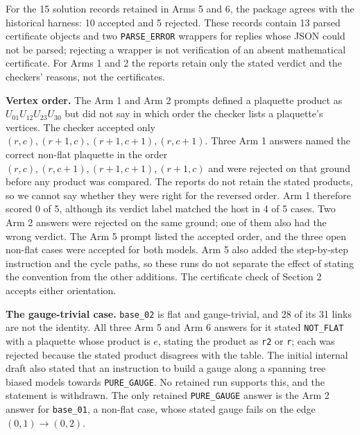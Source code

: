 \documentclass[
  11pt,
]{article}
\begin{document}
For the 15 solution records retained in Arms 5 and 6, the package agrees
with the historical harness: 10 accepted and 5 rejected. These records
contain 13 parsed certificate objects and two
\texttt{PARSE\_\allowbreak{}ERROR} wrappers for replies whose JSON could
not be parsed; rejecting a wrapper is not verification of an absent
mathematical certificate. For Arms 1 and 2 the reports retain only the
stated verdict and the checkers' reasons, not the certificates.

\textbf{Vertex order.} The Arm 1 and Arm 2 prompts defined a plaquette
product as \(U_{01} U_{12} U_{23} U_{30}\) but did not say in which
order the checker lists a plaquette's vertices. The checker accepted
only \((r,c), (r+1,c), (r+1,c+1), (r,c+1)\). Three Arm 1 answers named
the correct non-flat plaquette in the order
\((r,c), (r,c+1), (r+1,c+1), (r+1,c)\) and were rejected on that ground
before any product was compared. The reports do not retain the stated
products, so we cannot say whether they were right for the reversed
order. Arm 1 therefore scored 0 of 5, although its verdict label matched
the host in 4 of 5 cases. Two Arm 2 answers were rejected on the same
ground; one of them also had the wrong verdict. The Arm 5 prompt listed
the accepted order, and the three open non-flat cases were accepted for
both models. Arm 5 also added the step-by-step instruction and the cycle
paths, so these runs do not separate the effect of stating the
convention from the other additions. The certificate check of Section 2
accepts either orientation.

\textbf{The gauge-trivial case.} \texttt{base\_\allowbreak{}02} is flat
and gauge-trivial, and 28 of its 31 links are not the identity. All
three Arm 5 and Arm 6 answers for it stated
\texttt{NOT\_\allowbreak{}FLAT} with a plaquette whose product is \(e\),
stating the product as \texttt{r2} or \texttt{r}; each was rejected
because the stated product disagrees with the table. The initial
internal draft also stated that an instruction to build a gauge along a
spanning tree biased models towards \texttt{PURE\_\allowbreak{}GAUGE}.
No retained run supports this, and the statement is withdrawn. The only
retained \texttt{PURE\_\allowbreak{}GAUGE} answer is the Arm 2 answer
for \texttt{base\_\allowbreak{}01}, a non-flat case, whose stated gauge
fails on the edge \((0,1) \to (0,2)\).
\end{document}
